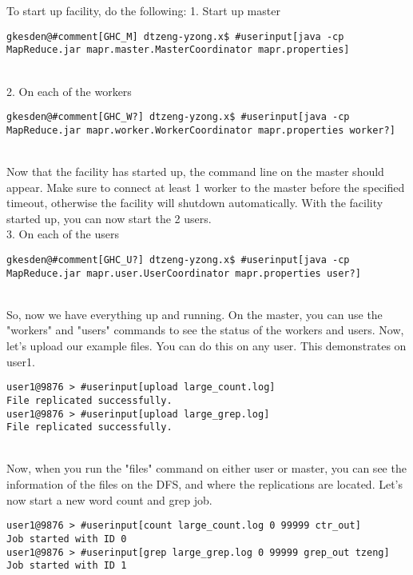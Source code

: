 \documentclass{article} %
\begin{document}
To start up facility, do the following:
1. Start up master
\begin{Verbatim}[fontsize=\small, xleftmargin=-.5in,commandchars=\#\[\]]
gkesden@#comment[GHC_M] dtzeng-yzong.x$ #userinput[java -cp MapReduce.jar mapr.master.MasterCoordinator mapr.properties]
\end{Verbatim}
\\
2. On each of the workers
\begin{Verbatim}[fontsize=\small, xleftmargin=-.5in,commandchars=\#\[\]]
gkesden@#comment[GHC_W?] dtzeng-yzong.x$ #userinput[java -cp MapReduce.jar mapr.worker.WorkerCoordinator mapr.properties worker?]
\end{Verbatim}
\\
Now that the facility has started up, the command line on the master should appear.  Make sure to connect at least 1 worker to the master before the specified timeout, otherwise the facility will shutdown automatically.  With the facility started up, you can now start the 2 users.\\
3. On each of the users
\begin{Verbatim}[fontsize=\small, xleftmargin=-.5in,commandchars=\#\[\]]
gkesden@#comment[GHC_U?] dtzeng-yzong.x$ #userinput[java -cp MapReduce.jar mapr.user.UserCoordinator mapr.properties user?]
\end{Verbatim}
\\
So, now we have everything up and running.  On the master, you can use the "workers" and "users" commands to see the status of the workers and users.  Now, let's upload our example files.  You can do this on any user.  This demonstrates on user1.
\begin{Verbatim}[fontsize=\small, xleftmargin=-.5in,commandchars=\#\[\]]
user1@9876 > #userinput[upload large_count.log]
File replicated successfully.
user1@9876 > #userinput[upload large_grep.log]
File replicated successfully.
\end{Verbatim}
\\
Now, when you run the "files" command on either user or master, you can see the information of the files on the DFS, and where the replications are located.  Let's now start a new word count and grep job.
\begin{Verbatim}[fontsize=\small, xleftmargin=-.5in,commandchars=\#\[\]]
user1@9876 > #userinput[count large_count.log 0 99999 ctr_out]
Job started with ID 0
user1@9876 > #userinput[grep large_grep.log 0 99999 grep_out tzeng]
Job started with ID 1
\end{Verbatim}
\end{document}
